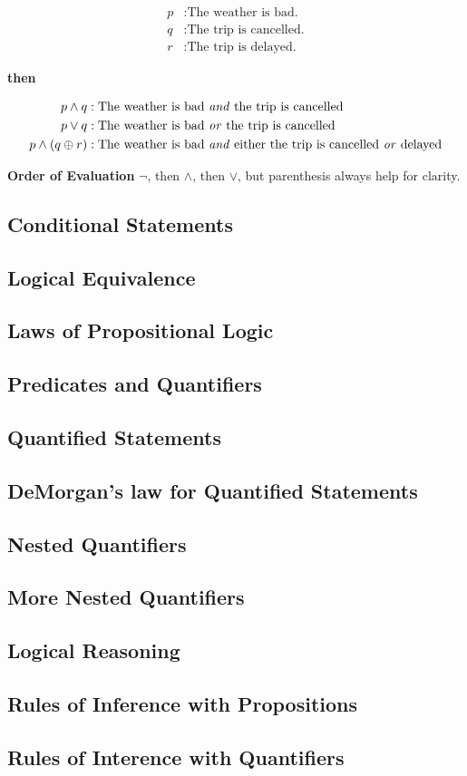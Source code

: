 \documentclass{article}
\begin{document}
\begin{align*}
  p&: \text{The weather is bad.} \\
  q&: \text{The trip is cancelled.} \\
  r&: \text{The trip is delayed.}
\end{align*}

\begin{center}
  \textbf{then}
\end{center}

\begin{align*}
  p \land q &: \text{The weather is bad \textit{and} the trip is cancelled} \\
  p \lor q &: \text{The weather is bad \textit{or} the trip is cancelled} \\
  p \land (q \oplus r)&: \text{The weather is bad \textit{and} either the trip is cancelled \textit{or} delayed}
\end{align*}

\textbf{Order of Evaluation} \(\lnot\), then \(\land\), then \(\lor\), but parenthesis always help for clarity.

\subsection{Conditional Statements}
\subsection{Logical Equivalence}
\subsection{Laws of Propositional Logic}
\subsection{Predicates and Quantifiers}
\subsection{Quantified Statements}
\subsection{DeMorgan's law for Quantified Statements}
\subsection{Nested Quantifiers}
\subsection{More Nested Quantifiers}
\subsection{Logical Reasoning}
\subsection{Rules of Inference with Propositions}
\subsection{Rules of Interence with Quantifiers}
\end{document}
